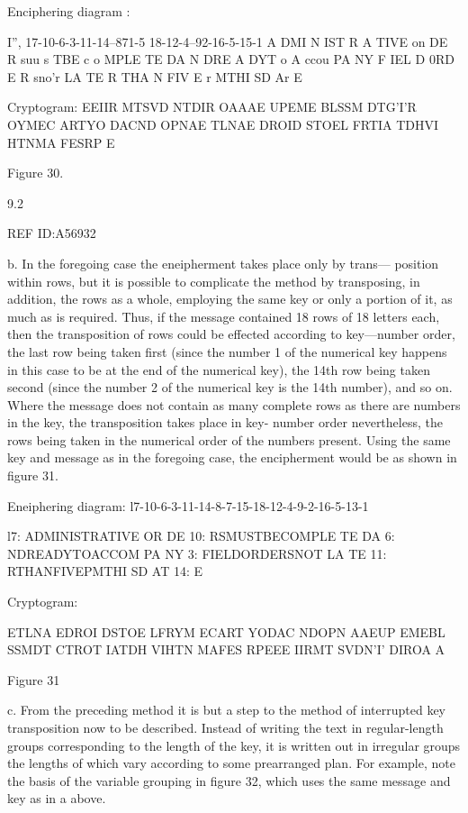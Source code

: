 {Enciphering diagram :

 

I”, 17-10-6-3-11-14--871-5 18-12-4--92-16-5-15-1
A DMI N IST R A TIVE on DE
R suu s TBE c o MPLE TE DA
N DRE A DYT o A ccou PA NY
F IEL D 0RD E R sno'r LA TE
R THA N FIV E r MTHI SD Ar
E

Cryptogram:
EEIIR MTSVD NTDIR OAAAE UPEME BLSSM
DTG'I'R OYMEC ARTYO DACND OPNAE TLNAE
DROID STOEL FRTIA TDHVI HTNMA FESRP
E

Figure 30.

9.2

 

 

REF ID:A56932

b. In the foregoing case the eneipherment takes place only by trans—
position within rows, but it is possible to complicate the method by
transposing, in addition, the rows as a whole, employing the same key
or only a portion of it, as much as is required. Thus, if the message
contained 18 rows of 18 letters each, then the transposition of rows
could be effected according to key—number order, the last row being
taken ﬁrst (since the number 1 of the numerical key happens in this
case to be at the end of the numerical key), the 14th row being taken
second (since the number 2 of the numerical key is the 14th number),
and so on. Where the message does not contain as many complete rows
as there are numbers in the key, the transposition takes place in key-
number order nevertheless, the rows being taken in the numerical order
of the numbers present. Using the same key and message as in the
foregoing case, the encipherment would be as shown in ﬁgure 31.

Eneiphering diagram:
l7-10-6-3-11-14-8-7-15-18-12-4-9-2-16-5-13-1

 

l7: ADMINISTRATIVE OR DE
10: RSMUSTBECOMPLE TE DA
6: NDREADYTOACCOM PA NY
3: FIELDORDERSNOT LA TE
11: RTHANFIVEPMTHI SD AT
14: E

Cryptogram:

ETLNA EDROI DSTOE LFRYM ECART YODAC
NDOPN AAEUP EMEBL SSMDT CTROT IATDH
VIHTN MAFES RPEEE IIRMT SVDN'I' DIROA
A

Figure 31

c. From the preceding method it is but a step to the method of
interrupted key transposition now to be described. Instead of writing
the text in regular-length groups corresponding to the length of the
key, it is written out in irregular groups the lengths of which vary
according to some prearranged plan. For example, note the basis of
the variable grouping in ﬁgure 32, which uses the same message and
key as in a above.

}
